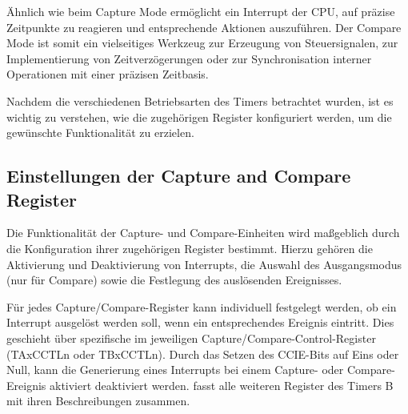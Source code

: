 \"Ahnlich wie beim Capture Mode erm\"oglicht ein Interrupt der CPU, auf pr\"azise Zeitpunkte zu reagieren und entsprechende Aktionen auszuf\"uhren. Der Compare Mode ist somit ein vielseitiges Werkzeug zur Erzeugung von Steuersignalen, zur Implementierung von Zeitverz\"ogerungen oder zur Synchronisation interner Operationen mit einer pr\"azisen Zeitbasis. 

Nachdem die verschiedenen Betriebsarten des Timers betrachtet wurden, ist es wichtig zu verstehen, wie die zugeh\"origen Register konfiguriert werden, um die gew\"unschte Funktionalit\"at zu erzielen.


\subsection{Einstellungen der Capture and Compare Register}
\label{CC_Register}

Die Funktionalit\"at der Capture- und Compare-Einheiten wird ma{\ss}geblich durch die Konfiguration ihrer zugeh\"origen Register bestimmt. Hierzu geh\"oren die Aktivierung und Deaktivierung von Interrupts, die Auswahl des Ausgangsmodus (nur f\"ur Compare) sowie die Festlegung des ausl\"osenden Ereignisses.

F\"ur jedes Capture/Compare-Register kann individuell festgelegt werden, ob ein Interrupt ausgel\"ost werden soll, wenn ein entsprechendes Ereignis eintritt. Dies geschieht \"uber spezifische  im jeweiligen Capture/Compare-Control-Register (TAxCCTLn oder TBxCCTLn). Durch das Setzen des CCIE-Bits auf Eins oder Null, kann die Generierung eines Interrupts bei einem Capture- oder Compare-Ereignis aktiviert \bzw deaktiviert werden.  fasst alle weiteren Register des Timers B mit ihren Beschreibungen zusammen.


